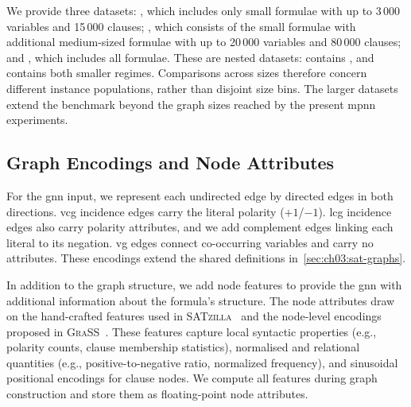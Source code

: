 We provide three datasets: , which includes only small formulae with up to 3\,000 variables and 15\,000 clauses; , which consists of the small formulae with additional medium-sized formulae with up to 20\,000 variables and 80\,000 clauses; and , which includes all formulae. These are nested datasets:  contains , and  contains both smaller regimes. Comparisons across sizes therefore concern different instance populations, rather than disjoint size bins. The larger datasets extend the benchmark beyond the graph sizes reached by the present \gls{mpnn} experiments.

\subsection{Graph Encodings and Node Attributes}
\label{sec:ch07:encodings}
For the \gls{gnn} input, we represent each undirected edge by directed edges in both directions. \gls{vcg} incidence edges carry the literal polarity ($+1$/$-1$). \gls{lcg} incidence edges also carry polarity attributes, and we add complement edges linking each literal to its negation. \gls{vg} edges connect co-occurring variables and carry no attributes. These encodings extend the shared definitions in~\cref{sec:ch03:sat-graphs}.

In addition to the graph structure, we add node features to provide the \gls{gnn} with additional information about the formula's structure. The node attributes draw on the hand-crafted features used in \textsc{SATzilla}~\citep{NudEtAl04b} and the node-level encodings proposed in \textsc{GraSS}~\citep{ZhaEtAl24b}. These features capture local syntactic properties (e.g., polarity counts, clause membership statistics), normalised and relational quantities (e.g., positive-to-negative ratio, normalized frequency), and sinusoidal positional encodings for clause nodes. We compute all features during graph construction and store them as floating-point node attributes.

